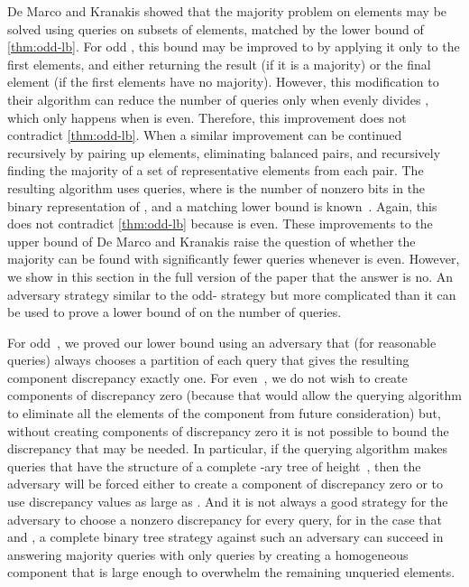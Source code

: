 \documentclass[11pt]{llncs}
\begin{document}
De Marco and Kranakis showed that the majority problem on  elements may be solved using   queries on subsets of  elements, matched by the lower bound of \autoref{thm:odd-lb}. For odd , this bound may be improved to  by applying it only to the first  elements, and either returning the result (if it is a majority) or the final element (if the first  elements have no majority). However, this modification to their algorithm can reduce the number of queries only when  evenly divides , which only happens when  is even. Therefore, this improvement does not contradict \autoref{thm:odd-lb}.
When  a similar improvement can be continued recursively by pairing up elements, eliminating balanced pairs, and recursively finding the majority of a set of representative elements from each pair. The resulting algorithm uses  queries, where  is the number of nonzero bits in the binary representation of , and a matching lower bound is known~\cite{SakWer-Comb-91}. Again, this does not contradict \autoref{thm:odd-lb} because  is even.
These improvements to the upper bound of De Marco and Kranakis raise the question of whether the majority can be found with significantly fewer queries whenever  is even. However, we show
\ifFull
in this section
\else
in the full version of the paper
\fi
that the answer is no. An adversary strategy similar to the odd- strategy but more complicated than it can be used to prove a lower bound of  on the number of queries.
\ifFull

For odd~, we proved our lower bound using an adversary that (for reasonable queries) always chooses a partition of each query that gives the resulting component discrepancy exactly one. For even~, we do not wish to create components of discrepancy zero (because that would allow the querying algorithm to eliminate all the elements of the component from future consideration) but, without creating components of discrepancy zero it is not possible to bound the discrepancy that may be needed. In particular, if the querying algorithm makes queries that have the structure of a complete -ary tree of height~, then the adversary will be forced either to create a component of discrepancy zero or to use discrepancy values as large as . And it is not always a good strategy for the adversary to choose a nonzero discrepancy for every query, for in the case that  and , a complete binary tree strategy against such an adversary can succeed in answering majority queries with only  queries by creating a homogeneous component that is large enough to overwhelm the remaining unqueried elements.
\end{document}
